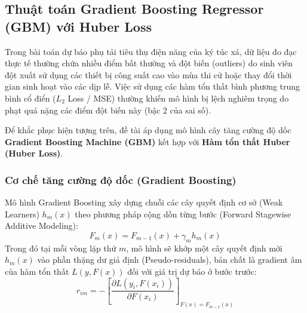\subsection{Thuật toán Gradient Boosting Regressor (GBM) với Huber Loss}
Trong bài toán dự báo phụ tải tiêu thụ điện năng của ký túc xá, dữ liệu đo đạc thực tế thường chứa nhiều điểm bất thường và đột biến (outliers) do sinh viên đột xuất sử dụng các thiết bị công suất cao vào mùa thi cử hoặc thay đổi thời gian sinh hoạt vào các dịp lễ. Việc sử dụng các hàm tổn thất bình phương trung bình cổ điển ($L_2$ Loss / MSE) thường khiến mô hình bị lệch nghiêm trọng do phạt quá nặng các điểm đột biến này (bậc 2 của sai số).

Để khắc phục hiện tượng trên, đề tài áp dụng mô hình cây tăng cường độ dốc \textbf{Gradient Boosting Machine (GBM)} kết hợp với \textbf{Hàm tổn thất Huber (Huber Loss)}.

\subsubsection{Cơ chế tăng cường độ dốc (Gradient Boosting)}
Mô hình Gradient Boosting xây dựng chuỗi các cây quyết định cơ sở (Weak Learners) $h_m(x)$ theo phương pháp cộng dồn từng bước (Forward Stagewise Additive Modeling):
\begin{equation}
    F_m(x) = F_{m-1}(x) + \gamma_m h_m(x)
    \label{eq:gbm_update}
\end{equation}
Trong đó tại mỗi vòng lặp thứ $m$, mô hình sẽ khớp một cây quyết định mới $h_m(x)$ vào phần thặng dư giả định (Pseudo-residuals), bản chất là gradient âm của hàm tổn thất $L(y, F(x))$ đối với giá trị dự báo ở bước trước:
\begin{equation}
    r_{im} = -\left[ \frac{\partial L(y_i, F(x_i))}{\partial F(x_i)} \right]_{F(x) = F_{m-1}(x)}
    \label{eq:gbm_residuals}
\end{equation}

